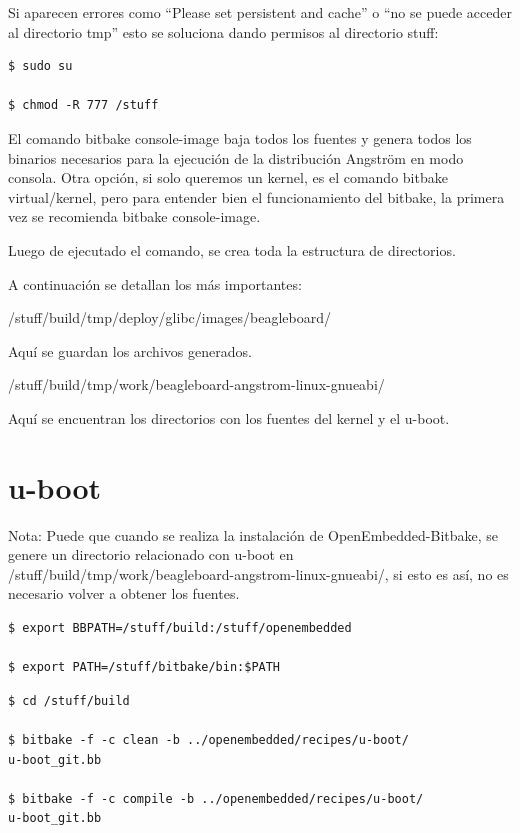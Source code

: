 \bigskip
Si aparecen errores como “Please set persistent and cache” o “no se puede acceder al directorio tmp” esto se soluciona dando permisos al directorio stuff:

\begin{verbatim}
$ sudo su

$ chmod -R 777 /stuff
\end{verbatim}

El comando bitbake console-image baja todos los fuentes y genera todos los binarios necesarios para la ejecución de la  distribución Angström en modo consola. Otra opción, si solo queremos un kernel, es el comando bitbake virtual/kernel, pero para entender bien el funcionamiento del bitbake, la primera vez se recomienda bitbake console-image.

\bigskip
Luego de ejecutado el comando, se crea toda la estructura de directorios.

\bigskip
A continuación se detallan los más importantes:

\bigskip
/stuff/build/tmp/deploy/glibc/images/beagleboard/ 

Aquí se guardan los archivos generados.

\bigskip
/stuff/build/tmp/work/beagleboard-angstrom-linux-gnueabi/

Aquí se encuentran los directorios con los fuentes del kernel y el u-boot.

\section{u-boot}\label{anx_sw_ub}

Nota: Puede que cuando se realiza la instalación de OpenEmbedded-Bitbake, se genere un directorio relacionado con u-boot en /stuff/build/tmp/work/beagleboard-angstrom-linux-gnueabi/, si esto es así, no es necesario volver a obtener los fuentes.

\bigskip
{}

\bigskip
\begin{verbatim}
$ export BBPATH=/stuff/build:/stuff/openembedded

$ export PATH=/stuff/bitbake/bin:$PATH
\end{verbatim}

\bigskip
{}

\begin{verbatim}
$ cd /stuff/build

$ bitbake -f -c clean -b ../openembedded/recipes/u-boot/
u-boot_git.bb

$ bitbake -f -c compile -b ../openembedded/recipes/u-boot/
u-boot_git.bb
\end{verbatim}

